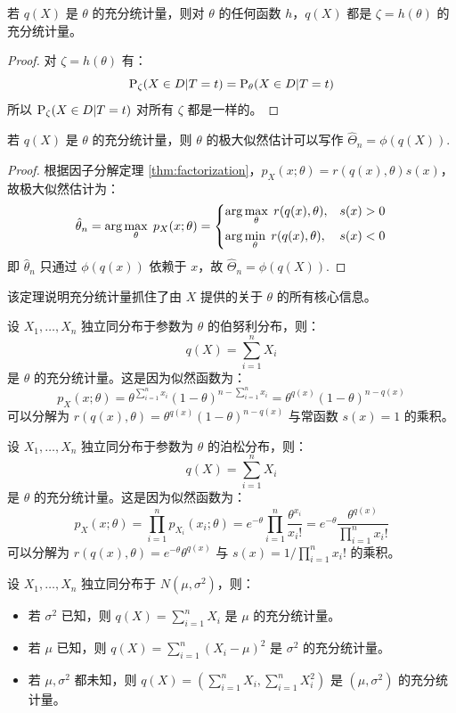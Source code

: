 \begin{theorem}
若 $q(X)$ 是 $\theta$ 的充分统计量，则对 $\theta$ 的任何函数 $h$，$q(X)$ 都是 $\zeta=h(\theta)$ 的充分统计量。
\end{theorem}
\begin{proof}
对 $\zeta=h(\theta)$ 有：
\[
\mathrm{P}_{\zeta}(X\in D\vert T=t)=\mathrm{P}_{\theta}(X\in D\vert T=t)
\]
所以 $\mathrm{P}_{\zeta}(X\in D\vert T=t)$ 对所有 $\zeta$ 都是一样的。
\end{proof}

\begin{theorem}
若 $q(X)$ 是 $\theta$ 的充分统计量，则 $\theta$ 的极大似然估计可以写作 $\hat\Theta_n=\phi(q(X))$.
\end{theorem}
\begin{proof}
根据因子分解定理 \ref{thm:factorization}，$p_X(x;\theta)=r(q(x),\theta)s(x)$，故极大似然估计为：
\[
\hat\theta_n=\arg\max_\theta\;p_X(x;\theta)=\begin{dcases}
    \arg\max_\theta\;r(q(x),\theta),&\text{$s(x)>0$}\\
    \arg\min_\theta\;r(q(x),\theta),&\text{$s(x)<0$}
\end{dcases}
\]
即 $\hat\theta_n$ 只通过 $\phi(q(x))$ 依赖于 $x$，故 $\hat\Theta_n=\phi(q(X))$.
\end{proof}
\begin{remark}
该定理说明充分统计量抓住了由 $X$ 提供的关于 $\theta$ 的所有核心信息。
\end{remark}

\begin{example}[伯努利分布]
设 $X_1,\ldots,X_n$ 独立同分布于参数为 $\theta$ 的伯努利分布，则：
\[
q(X)=\sum_{i=1}^nX_i
\]
是 $\theta$ 的充分统计量。这是因为似然函数为：
\[
p_X(x;\theta)=\theta^{\sum_{i=1}^n x_i}(1-\theta)^{n-\sum_{i=1}^nx_i}=\theta^{q(x)}(1-\theta)^{n-q(x)}
\]
可以分解为 $r(q(x),\theta)=\theta^{q(x)}(1-\theta)^{n-q(x)}$ 与常函数 $s(x)=1$ 的乘积。
\end{example}

\begin{example}[泊松分布]
设 $X_1,\ldots,X_n$ 独立同分布于参数为 $\theta$ 的泊松分布，则：
\[
q(X)=\sum_{i=1}^nX_i
\]
是 $\theta$ 的充分统计量。这是因为似然函数为：
\[
p_X(x;\theta)=\prod_{i=1}^np_{X_i}(x_i;\theta)=e^{-\theta}\prod_{i=1}^n\frac{\theta^{x_i}}{x_i!}=e^{-\theta}\frac{\theta^{q(x)}}{\prod_{i=1}^nx_i!}
\]
可以分解为 $r(q(x),\theta)=e^{-\theta}\theta^{q(x)}$ 与 $s(x)=1/\prod_{i=1}^nx_i!$ 的乘积。
\end{example}

\begin{example}[正态分布]
设 $X_1,\ldots,X_n$ 独立同分布于 $N(\mu,\sigma^2)$，则：
\begin{itemize}
    \item 若 $\sigma^2$ 已知，则 $q(X)=\sum_{i=1}^nX_i$ 是 $\mu$ 的充分统计量。
    \item 若 $\mu$ 已知，则 $q(X)=\sum_{i=1}^n(X_i-\mu)^2$ 是 $\sigma^2$ 的充分统计量。
    \item 若 $\mu,\sigma^2$ 都未知，则 $q(X)=(\sum_{i=1}^nX_i,\sum_{i=1}^nX_i^2)$ 是 $(\mu,\sigma^2)$ 的充分统计量。
\end{itemize}
\end{example}

